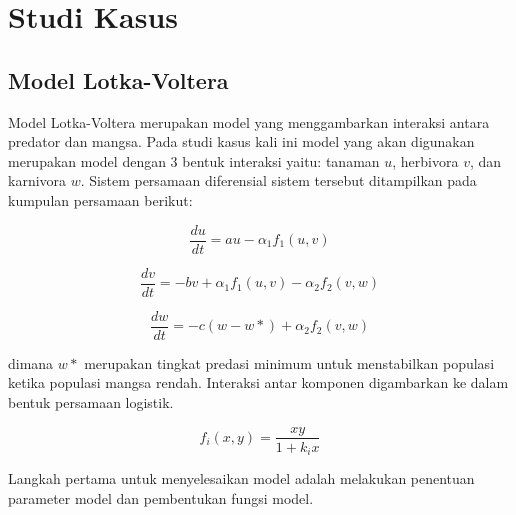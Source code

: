 \documentclass[]{book}
\theoremstyle{definition}
\theoremstyle{definition}
\theoremstyle{definition}
\theoremstyle{remark}
\begin{document}
\hypertarget{studi-kasus-3}{%
\section{Studi Kasus}\label{studi-kasus-3}}

\hypertarget{model-lotka-voltera}{%
\subsection{Model Lotka-Voltera}\label{model-lotka-voltera}}

Model Lotka-Voltera merupakan model yang menggambarkan interaksi antara predator dan mangsa. Pada studi kasus kali ini model yang akan digunakan merupakan model dengan 3 bentuk interaksi yaitu: tanaman \(u\), herbivora \(v\), dan karnivora \(w\). Sistem persamaan diferensial sistem tersebut ditampilkan pada kumpulan persamaan berikut:

\begin{equation}
\frac{du}{dt}=au-\alpha_1f_1\left(u,v\right)
  \label{eq:lv}
\end{equation}

\begin{equation}
\frac{dv}{dt}=-bv+\alpha_1f_1\left(u,v\right)-\alpha_2f_2\left(v,w\right)
  \label{eq:lv2}
\end{equation}

\begin{equation}
\frac{dw}{dt}=-c\left(w-w\ast\right)+\alpha_2f_2\left(v,w\right)
  \label{eq:lv3}
\end{equation}

dimana \(w\ast\) merupakan tingkat predasi minimum untuk menstabilkan populasi ketika populasi mangsa rendah. Interaksi antar komponen digambarkan ke dalam bentuk persamaan logistik.

\begin{equation}
f_i\left(x,y\right)=\frac{xy}{1+k_ix}
  \label{eq:lv4}
\end{equation}

Langkah pertama untuk menyelesaikan model adalah melakukan penentuan parameter model dan pembentukan fungsi model.
\end{document}
